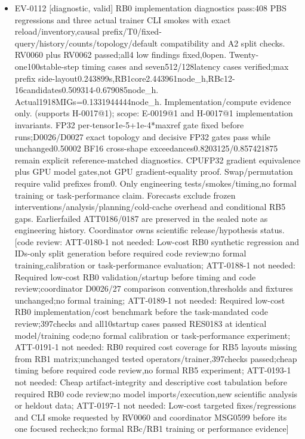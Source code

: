 \documentclass[11pt]{article}
\begin{document}
\begin{itemize}
\item EV-0112 [diagnostic, valid] RB0 implementation diagnostics pass:408 PBS regressions and three actual trainer CLI smokes with exact reload/inventory,causal prefix/T0/fixed-query/history/counts/topology/default compatibility and A2 split checks. RV0060 plus RV0062 passed;all4 low findings fixed,0open. Twenty-one100stable-step timing cases and seven512/128latency cases verified;max prefix side-layout0.243899s,RB1core2.443961node\_h,RBc12-16candidates0.509314-0.679085node\_h. Actual1918MIGs=0.1331944444node\_h. Implementation/compute evidence only. (supports H-0017@1); scope: E-0019@1 and H-0017@1 implementation invariants. FP32 per-tensor1e-5+1e-4*maxref gate fixed before runs;D0026/D0027 exact topology and decisive FP32 gates pass while unchanged0.50002 BF16 cross-shape exceedances0.8203125/0.857421875 remain explicit reference-matched diagnostics. CPUFP32 gradient equivalence plus GPU model gates,not GPU gradient-equality proof. Swap/permutation require valid prefixes from0. Only engineering tests/smokes/timing,no formal training or task-performance claim. Forecasts exclude frozen interventions/analysis/planning/cold-cache overhead and conditional RB5 gaps. Earlierfailed ATT0186/0187 are preserved in the sealed note as engineering history. Coordinator owns scientific release/hypothesis status. [code review: ATT-0180-1 not needed: Low-cost RB0 synthetic regression and IDs-only split generation before required code review;no formal training,calibration or task-performance evaluation; ATT-0188-1 not needed: Required low-cost RB0 validation/startup before timing and code review;coordinator D0026/27 comparison convention,thresholds and fixtures unchanged;no formal training; ATT-0189-1 not needed: Required low-cost RB0 implementation/cost benchmark before the task-mandated code review;397checks and all10startup cases passed RES0183 at identical model/training code;no formal calibration or task-performance experiment; ATT-0191-1 not needed: RB0 required cost coverage for RB5 layouts missing from RB1 matrix;unchanged tested operators/trainer,397checks passed;cheap timing before required code review,no formal RB5 experiment; ATT-0193-1 not needed: Cheap artifact-integrity and descriptive cost tabulation before required RB0 code review;no model imports/execution,new scientific analysis or heldout data; ATT-0197-1 not needed: Low-cost targeted fixes/regressions and CLI smoke requested by RV0060 and coordinator MSG0599 before its one focused recheck;no formal RBc/RB1 training or performance evidence]

\end{itemize}
\end{document}
